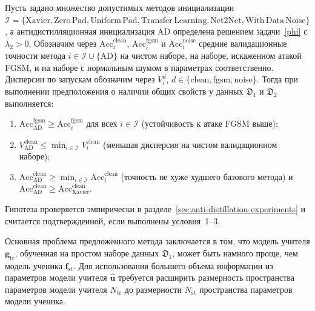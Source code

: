 \begin{hypothesis}
Пусть задано множество допустимых методов инициализации $\mathcal{I}=\{\mathrm{Xavier}, \mathrm{Zero\,Pad}, \mathrm{Uniform\,Pad}, \mathrm{Transfer\,Learning}, \mathrm{Net2Net}, \mathrm{With\,Data\,Noise}\}$, а антидистилляционная инициализация $\mathrm{AD}$ определена решением задачи~\eqref{phi} с $\lambda_2>0$.
Обозначим через $\mathrm{Acc}^{\mathrm{clean}}_{i}$, $\mathrm{Acc}^{\mathrm{fgsm}}_{i}$ и $\mathrm{Acc}^{\mathrm{noise}}_{i}$ средние валидационные точности метода $i\in\mathcal{I}\cup\{\mathrm{AD}\}$ на чистом наборе, на наборе, искаженном атакой FGSM, и на наборе с нормальным шумом в параметрах соответственно. Дисперсии по запускам обозначим через $V_i^{d}$, $d\in\{\mathrm{clean},\mathrm{fgsm},\mathrm{noise}\}$.
Тогда при выполнении предположения о наличии общих свойств у данных $\mathfrak{D}_1$ и $\mathfrak{D}_2$ выполняется:
\begin{enumerate}
    \item $\mathrm{Acc}^{\mathrm{fgsm}}_{\mathrm{AD}} \geqslant \mathrm{Acc}^{\mathrm{fgsm}}_{i}$ для всех $i\in\mathcal{I}$ (устойчивость к атаке FGSM выше);
    \item $V^{\mathrm{clean}}_{\mathrm{AD}} \leqslant \min_{i\in\mathcal{I}} V^{\mathrm{clean}}_{i}$ (меньшая дисперсия на чистом валидационном наборе);
    \item $\mathrm{Acc}^{\mathrm{clean}}_{\mathrm{AD}} \geqslant \min_{i\in\mathcal{I}} \mathrm{Acc}^{\mathrm{clean}}_{i}$ (точность не хуже худшего базового метода) и $\mathrm{Acc}^{\mathrm{clean}}_{\mathrm{AD}}\geqslant \mathrm{Acc}^{\mathrm{clean}}_{\mathrm{Xavier}}$.
\end{enumerate}
Гипотеза проверяется эмпирически в разделе~\ref{sec:anti-distillation-experiments} и считается подтвержденной, если выполнены условия~1--3.
\end{hypothesis}

Основная проблема предложенного метода заключается в том, что модель учителя $\mathbf{g}_\text{tr}$, обученная на простом наборе данных $\mathfrak{D}_1$, может быть намного проще, чем модель ученика $\mathbf{f}_\text{st}$. Для использования большего объема информации из параметров модели учителя $\hat{\mathbf{u}}$ требуется расширить размерность пространства параметров модели учителя ${N_\text{tr}}$ до размерности ${N_\text{st}}$ пространства параметров модели ученика.

